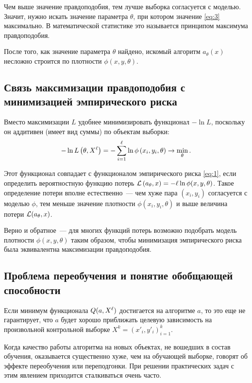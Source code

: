 Чем выше значение правдоподобия, тем лучше выборка согласуется с моделью. Значит, нужно искать значение
параметра \( \theta \), при котором значение \eqref{eq:3} максимально. В математической статистике это
называется принципом максимума правдоподобия.

После того, как значение параметра \( \theta \) найдено, искомый алгоритм \( a_\theta(x) \) несложно
строится по плотности \( \phi(x, y, \theta) \).

\subsection{Связь максимизации правдоподобия с минимизацией эмпирического риска}
Вместо максимизации \( L \) удобнее минимизировать функционал \( -\ln L \), поскольку он аддитивен
(имеет вид суммы) по объектам выборки:
\begin{equation}
  -\ln L\left(\theta, X^\l\right) = -\sum_{i = 1}^\l \ln\phi\left(x_i, y_i, \theta\right)
  \to\min_{\theta}.
  \label{eq:4}
\end{equation}

Этот функционал совпадает с функционалом эмпирического риска \eqref{eq:1}, если определить
вероятностную функцию потерь \( \L\left(a_\theta, x\right) = -\l\ln\phi(x, y, \theta) \). Такое
определение потери вполне естественно~--- чем хуже пара \( (x_i, y_i) \) согласуется с моделью
\( \phi \), тем меньше значение плотности \( \phi(x_i, y_i, \theta) \) и выше величина потери
\( \L (a_\theta, x) \).

Верно и обратное~--- для многих функций потерь возможно подобрать модель плотности
\( \phi(x, y, \theta) \) таким образом, чтобы минимизация эмпирического риска была эквивалентна
максимизации правдоподобия.

\subsection{Проблема переобучения и понятие обобщающей способности}
Если минимум функционала \( Q(a, X^\ell) \) достигается на алгоритме \( a \), то это еще не гарантирует,
что \( a \) будет хорошо приближать целевую зависимость на произвольной контрольной выборке
\( X^k = (x'_i, y'_i)^k_{i = 1} \).

Когда качество работы алгоритма на новых объектах, не вошедших в состав обучения, оказывается
существенно хуже, чем на обучающей выборке, говорят об эффекте переобучения или переподгонки. При
решении практических задач с этим явлением приходится сталкиваться очень часто.

